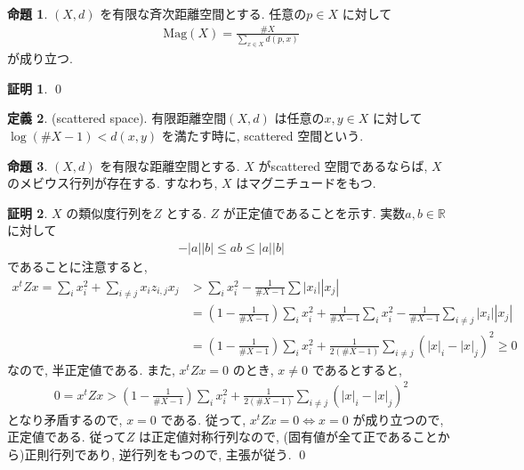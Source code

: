 \documentclass[10pt, fleqn, label-section=none]{bxjsarticle}
\theoremstyle{definition}
\newtheorem{dfn}{定義}[section]
\newtheorem{prop}[dfn]{命題}
\newtheorem*{pf*}{証明}
\newcommand{\abs}[1]{\left|#1\right|}
\newcommand{\LR}{\Leftrightarrow}
\renewcommand{\;}{\, ; \,}
\newcommand{\Mag}{\textrm{Mag}}
\begin{document}
\begin{prop}$(X, d)$ を有限な斉次距離空間とする. 任意の$p \in X$ に対して 
\begin{align*} \Mag(X) = \frac{\# X}{\sum_{x \in X} d(p, x)}  \end{align*}
が成り立つ.
\end{prop}
\begin{pf*}

\qed
\end{pf*}





\begin{dfn}(scattered space). 有限距離空間$(X, d)$ は任意の$x, y \in X$ に対して$\log(\# X - 1) < d(x, y)$ を満たす時に, scattered 空間という. 

\end{dfn}


\begin{prop}$(X, d)$ を有限な距離空間とする. $X$ がscattered 空間であるならば, 
$X$ のメビウス行列が存在する. すなわち, $X$ はマグニチュードをもつ. 
\end{prop}
\begin{pf*}$X$ の類似度行列を$Z$ とする. $Z$ が正定値であることを示す. 実数$a,b \in \mathbb R$ に対して
\begin{align*} -\abs a \abs b \leq a b \leq \abs a \abs b \end{align*}
であることに注意すると, 
\begin{align*} x^t Z x = \sum_i x_i^2 + \sum_{i \neq j} x_i z_{i, j} x_j &> \sum_i  x_i^2 - \frac{1}{\# X - 1} \sum \abs{x_i} \abs{x_j} \\ &= (1 - \frac{1}{\# X - 1} )\sum_i x_i^2 + \frac{1}{\# X - 1 } \sum_i  x_i^2 - \frac{1}{\# X - 1} \sum_
{i \neq j} \abs{x_i} \abs{x_j} \\&=    (1 - \frac{1}{\# X - 1} )\sum_i x_i^2 + \frac{1}{2(\# X - 1)} \sum_{i \neq j} (\abs x_i  - \abs x_j )^2 \geq 0 \end{align*}
なので, 半正定値である. また, $x^t Z x = 0$ のとき, $x \neq 0$ であるとすると, 
\begin{align*} 0 = x^t Z x > (1 - \frac{1}{\# X - 1} )\sum_i x_i^2 + \frac{1}{2(\# X - 1)} \sum_{i \neq j} (\abs x_i  - \abs x_j )^2  \end{align*}
となり矛盾するので, $x = 0$ である. 従って, $x^t Z x = 0 \LR x = 0$ が成り立つので, 正定値である. 従って$Z$ は正定値対称行列なので, (固有値が全て正であることから)正則行列であり, 逆行列をもつので, 主張が従う.
\qed
\end{pf*}
\end{document}
